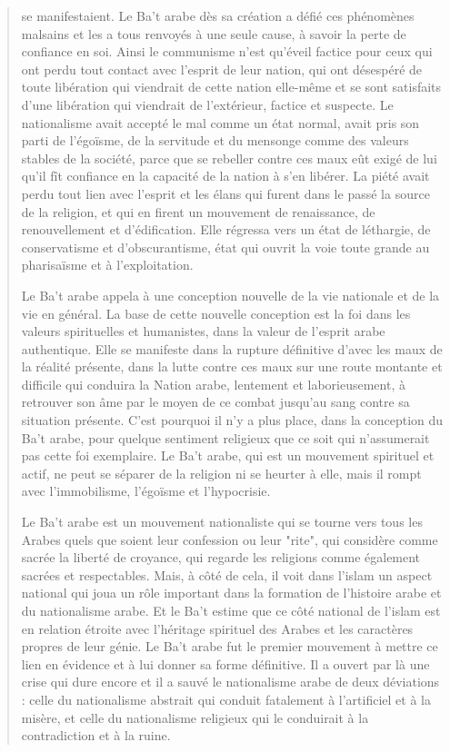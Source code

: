\begin{quote}
se manifestaient. Le Ba't arabe dès sa création a défié ces phénomènes
malsains et les a tous renvoyés à une seule cause, à savoir la perte de
confiance en soi. Ainsi le communisme n'est qu'éveil factice pour ceux
qui ont perdu tout contact avec l'esprit de leur nation, qui ont
désespéré de toute libération qui viendrait de cette nation elle-même et
se sont satisfaits d'une libération qui viendrait de l'extérieur,
factice et suspecte. Le nationalisme avait accepté le mal comme un état
normal, avait pris son parti de l'égoïsme, de la servitude et du
mensonge comme des valeurs stables de la société, parce que se rebeller
contre ces maux eût exigé de lui qu'il fît confiance en la capacité de
la nation à s'en libérer. La piété avait perdu tout lien avec l'esprit
et les élans qui furent dans le passé la source de la religion, et qui
en firent un mouvement de renaissance, de renouvellement et
d'édification. Elle régressa vers un état de léthargie, de conservatisme
et d'obscurantisme, état qui ouvrit la voie toute grande au pharisaïsme
et à l'exploitation.

Le Ba't arabe appela à une conception nouvelle de la vie nationale et de
la vie en général. La base de cette nouvelle conception est la foi dans
les valeurs spirituelles et humanistes, dans la valeur de l'esprit arabe
authentique. Elle se manifeste dans la rupture définitive d'avec les
maux de la réalité présente, dans la lutte contre ces maux sur une route
montante et difficile qui conduira la Nation arabe, lentement et
laborieusement, à retrouver son âme par le moyen de ce combat jusqu'au
sang contre sa situation présente. C'est pourquoi il n'y a plus place,
dans la conception du Ba't arabe, pour quelque sentiment religieux que
ce soit qui n'assumerait pas cette foi exemplaire. Le Ba't arabe, qui
est un mouvement spirituel et actif, ne peut se séparer de la religion
ni se heurter à elle, mais il rompt avec l'immobilisme, l'égoïsme et
l'hypocrisie.

Le Ba't arabe est un mouvement nationaliste qui se tourne vers tous les
Arabes quels que soient leur confession ou leur "rite", qui considère
comme sacrée la liberté de croyance, qui regarde les religions comme
également sacrées et respectables. Mais, à côté de cela, il voit dans
l'islam un aspect national qui joua un rôle important dans la formation
de l'histoire arabe et du nationalisme arabe. Et le Ba't estime que ce
côté national de l'islam est en relation étroite avec l'héritage
spirituel des Arabes et les caractères propres de leur génie. Le Ba't
arabe fut le premier mouvement à mettre ce lien en évidence et à lui
donner sa forme définitive. Il a ouvert par là une crise qui dure encore
et il a sauvé le nationalisme arabe de deux déviations : celle du
nationalisme abstrait qui conduit fatalement à l'artificiel et à la
misère, et celle du nationalisme religieux qui le conduirait à la
contradiction et à la ruine.


\end{quote}
